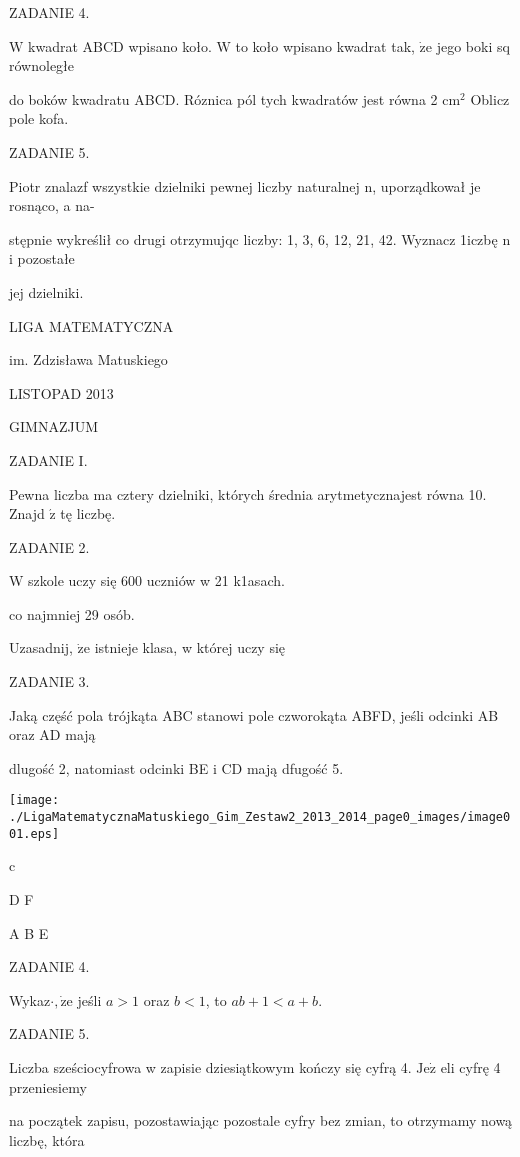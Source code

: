 \documentclass[a4paper,12pt]{article}
\begin{document}
ZADANIE 4.

$\mathrm{W}$ kwadrat ABCD wpisano koło. $\mathrm{W}$ to koło wpisano kwadrat tak, $\dot{\mathrm{z}}\mathrm{e}$ jego boki sq równoległe

do boków kwadratu ABCD. Róznica pól tych kwadratów jest równa 2 $\mathrm{c}\mathrm{m}^{2}$ Oblicz pole kofa.

ZADANIE 5.

Piotr znalazf wszystkie dzielniki pewnej liczby naturalnej n, uporządkował je rosnąco, a na-

stępnie wykreślił co drugi otrzymujqc liczby: 1, 3, 6, 12, 21, 42. Wyznacz 1iczbę n i pozostałe

jej dzielniki.






LIGA MATEMATYCZNA

im. Zdzisława Matuskiego

LISTOPAD 2013

GIMNAZJUM

ZADANIE I.

Pewna liczba ma cztery dzielniki, których średnia arytmetycznajest równa 10. Znajd $\acute{\mathrm{z}}$ tę liczbę.

ZADANIE 2.

W szkole uczy się 600 uczniów w 21 k1asach.

co najmniej 29 osób.

Uzasadnij, $\dot{\mathrm{z}}\mathrm{e}$ istnieje klasa, w której uczy się

ZADANIE 3.

Jaką część pola trójkąta ABC stanowi pole czworokąta ABFD, jeśli odcinki AB oraz AD mają

dlugość 2, natomiast odcinki BE i CD mają dfugość 5.
\begin{center}
\texttt{[image: ./LigaMatematycznaMatuskiego\_Gim\_Zestaw2\_2013\_2014\_page0\_images/image001.eps]}
\end{center}
c

D F

A  B  E

ZADANIE 4.

Wykaz$\cdot, \dot{\mathrm{z}}\mathrm{e}$ jeśli $a>1$ oraz $b<1$, to $ab+1<a+b.$

ZADANIE 5.

Liczba sześciocyfrowa w zapisie dziesiątkowym kończy się cyfrą 4. $\mathrm{J}\mathrm{e}\dot{\mathrm{z}}$ eli cyfrę 4 przeniesiemy

na początek zapisu, pozostawiając pozostale cyfry bez zmian, to otrzymamy nową liczbę, która
\end{document}
